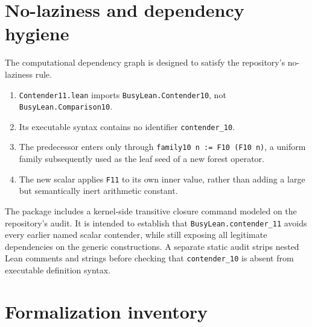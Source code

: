 \documentclass[11pt]{article}
\theoremstyle{definition}
\theoremstyle{remark}
\newcommand{\code}[1]{\texttt{#1}}
\begin{document}
\section{No-laziness and dependency hygiene}

The computational dependency graph is designed to satisfy the repository's
no-laziness rule.

\begin{enumerate}
\item \code{Contender11.lean} imports \code{BusyLean.Contender10}, not
\code{BusyLean.Comparison10}.
\item Its executable syntax contains no identifier \code{contender\_10}.
\item The predecessor enters only through
\code{family10 n := F10 (F10 n)}, a uniform family subsequently used as the
leaf seed of a new forest operator.
\item The new scalar applies \code{F11} to its own inner value, rather than
adding a large but semantically inert arithmetic constant.
\end{enumerate}

The package includes a kernel-side transitive closure command modeled on the
repository's audit.  It is intended to establish that
\code{BusyLean.contender\_11} avoids every earlier named scalar contender,
while still exposing all legitimate dependencies on the generic constructions.
A separate static audit strips nested Lean comments and strings before checking
that \code{contender\_10} is absent from executable definition syntax.

\section{Formalization inventory}
\end{document}
